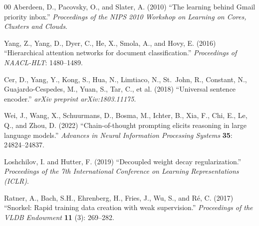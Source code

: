 \documentclass[3p,times,procedia]{elsarticle}
\begin{document}
\begin{thebibliography}{00}
Aberdeen, D., Pacovsky, O., and Slater, A. (2010) ``The learning behind Gmail priority inbox.'' {\it Proceedings of the NIPS 2010 Workshop on Learning on Cores, Clusters and Clouds}.

Yang, Z., Yang, D., Dyer, C., He, X., Smola, A., and Hovy, E. (2016) ``Hierarchical attention networks for document classification.'' {\it Proceedings of NAACL-HLT}: 1480--1489.

Cer, D., Yang, Y., Kong, S., Hua, N., Limtiaco, N., St.~John, R., Constant, N., Guajardo-Cespedes, M., Yuan, S., Tar, C., et al. (2018) ``Universal sentence encoder.'' {\it arXiv preprint arXiv:1803.11175}.

Wei, J., Wang, X., Schuurmans, D., Bosma, M., Ichter, B., Xia, F., Chi, E., Le, Q., and Zhou, D. (2022) ``Chain-of-thought prompting elicits reasoning in large language models.'' {\it Advances in Neural Information Processing Systems} {\bf 35}: 24824--24837.

Loshchilov, I. and Hutter, F. (2019) ``Decoupled weight decay regularization.'' {\it Proceedings of the 7th International Conference on Learning Representations (ICLR)}.

Ratner, A., Bach, S.H., Ehrenberg, H., Fries, J., Wu, S., and R\'{e}, C. (2017) ``Snorkel: Rapid training data creation with weak supervision.'' {\it Proceedings of the VLDB Endowment} {\bf 11} (3): 269--282.

\end{thebibliography}
\end{document}
